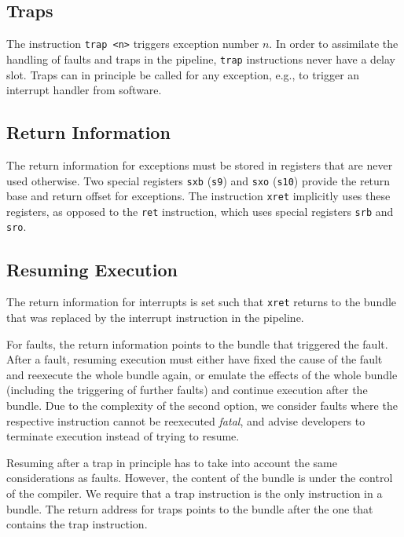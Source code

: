 \documentclass[a4paper,fontsize=10pt,twoside,DIV15,BCOR12mm,headinclude=true,footinclude=false,pagesize,bibtotoc]{scrbook}
\begin{document}
\subsection{Traps}

The instruction \texttt{trap <n>} triggers exception number $n$. In
order to assimilate the handling of faults and traps in the pipeline,
\texttt{trap} instructions never have a delay slot. Traps can in
principle be called for any exception, e.g., to trigger an interrupt
handler from software.

\subsection{Return Information}

The return information for exceptions must be stored in registers that
are never used otherwise. Two special registers \texttt{sxb}
(\texttt{s9}) and \texttt{sxo} (\texttt{s10}) provide the return base
and return offset for exceptions. The instruction \texttt{xret}
implicitly uses these registers, as opposed to the \texttt{ret}
instruction, which uses special registers \texttt{srb} and
\texttt{sro}.

\subsection{Resuming Execution}

The return information for interrupts is set such that \texttt{xret}
returns to the bundle that was replaced by the interrupt
instruction in the pipeline.

For faults, the return information points to the bundle that triggered
the fault. After a fault, resuming execution must either have fixed
the cause of the fault and reexecute the whole bundle again, or
emulate the effects of the whole bundle (including the triggering of
further faults) and continue execution after the bundle. Due to the
complexity of the second option, we consider faults where the
respective instruction cannot be reexecuted \emph{fatal}, and advise
developers to terminate execution instead of trying to resume.

Resuming after a trap in principle has to take into account the same
considerations as faults. However, the content of the bundle is under
the control of the compiler. We require that a trap instruction is the
only instruction in a bundle. The return address for traps points to
the bundle after the one that contains the trap instruction.
\end{document}
